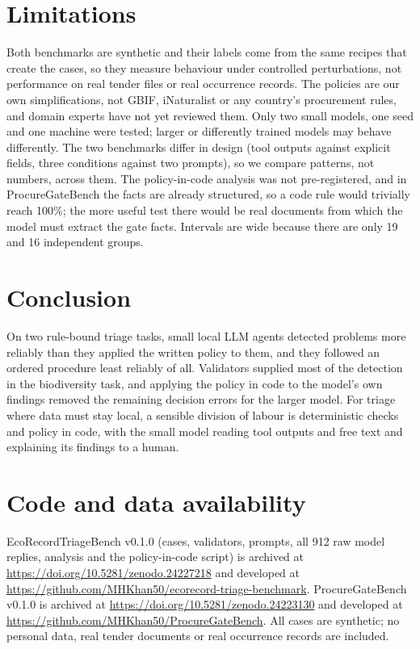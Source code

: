 \documentclass[11pt,a4paper]{article}
\begin{document}
\section{Limitations}

Both benchmarks are synthetic and their labels come from the same recipes that create the cases, so they measure
behaviour under controlled perturbations, not performance on real tender files or real occurrence records. The
policies are our own simplifications, not GBIF, iNaturalist or any country's procurement rules, and domain
experts have not yet reviewed them. Only two small models, one seed and one machine were tested; larger or
differently trained models may behave differently. The two benchmarks differ in design (tool outputs against
explicit fields, three conditions against two prompts), so we compare patterns, not numbers, across them. The
policy-in-code analysis was not pre-registered, and in ProcureGateBench the facts are already structured, so a
code rule would trivially reach 100\%; the more useful test there would be real documents from which the model
must extract the gate facts. Intervals are wide because there are only 19 and 16 independent groups.

\section{Conclusion}

On two rule-bound triage tasks, small local LLM agents detected problems more reliably than they applied the
written policy to them, and they followed an ordered procedure least reliably of all. Validators supplied most of
the detection in the biodiversity task, and applying the policy in code to the model's own findings removed the
remaining decision errors for the larger model. For triage where data must stay local, a sensible division of
labour is deterministic checks and policy in code, with the small model reading tool outputs and free text and
explaining its findings to a human.

\section*{Code and data availability}

EcoRecordTriageBench v0.1.0 (cases, validators, prompts, all 912 raw model replies, analysis and the
policy-in-code script) is archived at \url{https://doi.org/10.5281/zenodo.24227218} and developed at
\url{https://github.com/MHKhan50/ecorecord-triage-benchmark}. ProcureGateBench v0.1.0 is archived at
\url{https://doi.org/10.5281/zenodo.24223130} and developed at \url{https://github.com/MHKhan50/ProcureGateBench}.
All cases are synthetic; no personal data, real tender documents or real occurrence records are included.



\end{document}
